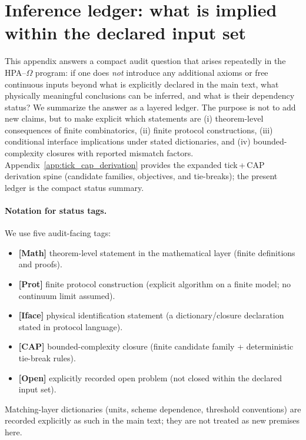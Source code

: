 \section{Inference ledger: what is implied within the declared input set}
\label{app:inference_ledger}

This appendix answers a compact audit question that arises repeatedly in the HPA--$\Omega$ program:
if one does \emph{not} introduce any additional axioms or free continuous inputs beyond what is explicitly declared in the main text, what physically meaningful conclusions can be inferred, and what is their dependency status?
We summarize the answer as a layered ledger.
The purpose is not to add new claims, but to make explicit which statements are (i) theorem-level consequences of finite combinatorics, (ii) finite protocol constructions, (iii) conditional interface implications under stated dictionaries, and (iv) bounded-complexity closures with reported mismatch factors.
Appendix~\ref{app:tick_cap_derivation} provides the expanded tick\,+\,CAP derivation spine (candidate families, objectives, and tie-breaks); the present ledger is the compact status summary.

\paragraph{Notation for status tags.}
We use five audit-facing tags:
\begin{itemize}
\item \textbf{[Math]} theorem-level statement in the mathematical layer (finite definitions and proofs).
\item \textbf{[Prot]} finite protocol construction (explicit algorithm on a finite model; no continuum limit assumed).
\item \textbf{[Iface]} physical identification statement (a dictionary/closure declaration stated in protocol language).
\item \textbf{[CAP]} bounded-complexity closure (finite candidate family + deterministic tie-break rules).
\item \textbf{[Open]} explicitly recorded open problem (not closed within the declared input set).
\end{itemize}
Matching-layer dictionaries (units, scheme dependence, threshold conventions) are recorded explicitly as such in the main text; they are not treated as new premises here.

